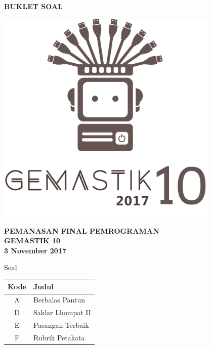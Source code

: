 \documentclass[a4paper]{article}
\begin{document}
\begin{titlepage}
\begin{center}

    \textbf{\huge BUKLET SOAL}
    
    \vspace{1cm} %
    
    \includegraphics[width=0.8\textwidth]{../gemastiklogo}
    
	\vspace{1cm} %
    
    \textbf{\LARGE PEMANASAN FINAL PEMROGRAMAN}\\[0.3cm]
    \textbf{\LARGE GEMASTIK 10}\\[0.5cm]
    \textbf{\LARGE 3 November 2017}

	\vfill
	
	{\Large Soal}
	
	\vspace{.2cm}
	
	\def\arraystretch{1.5} %
	\begin{tabular}{|c|l|}
		\hline
		\textbf{Kode} & \textbf{Judul} \\
		\hline
		A & Berbalas Pantun \\
		D & Saklar Lhompat II \\
		E & Pasangan Terbaik \\
		F & Rubrik Petakata \\
		\hline
	\end{tabular}
	
\end{center}
\end{titlepage}


\pagebreak

\pagebreak

\pagebreak

\end{document}
